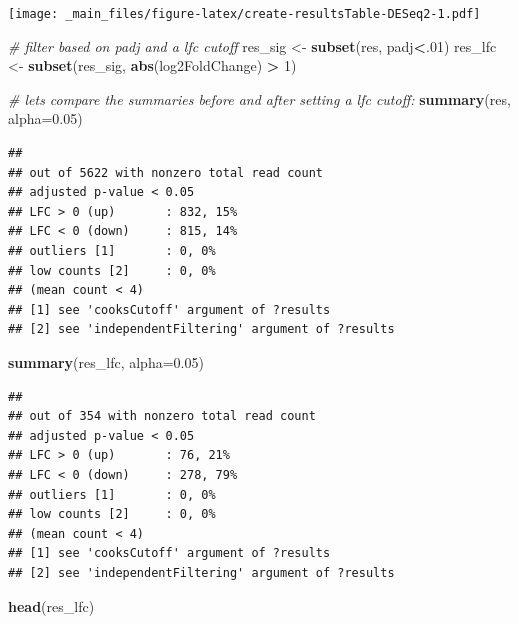 \documentclass[
]{book}
\newenvironment{Shaded}{\begin{snugshade}}{\end{snugshade}}
\newcommand{\AttributeTok}[1]{\textcolor[rgb]{0.13,0.29,0.53}{#1}}
\newcommand{\CommentTok}[1]{\textcolor[rgb]{0.56,0.35,0.01}{\textit{#1}}}
\newcommand{\DecValTok}[1]{\textcolor[rgb]{0.00,0.00,0.81}{#1}}
\newcommand{\FloatTok}[1]{\textcolor[rgb]{0.00,0.00,0.81}{#1}}
\newcommand{\FunctionTok}[1]{\textcolor[rgb]{0.13,0.29,0.53}{\textbf{#1}}}
\newcommand{\NormalTok}[1]{#1}
\newcommand{\OtherTok}[1]{\textcolor[rgb]{0.56,0.35,0.01}{#1}}
\newcommand{\SpecialCharTok}[1]{\textcolor[rgb]{0.81,0.36,0.00}{\textbf{#1}}}
\begin{document}
\texttt{[image: \_main\_files/figure-latex/create-resultsTable-DESeq2-1.pdf]}

\begin{Shaded}
\begin{Highlighting}[]
\CommentTok{\# filter based on padj and a lfc cutoff}
\NormalTok{res\_sig }\OtherTok{\textless{}{-}} \FunctionTok{subset}\NormalTok{(res, padj}\SpecialCharTok{\textless{}}\NormalTok{.}\DecValTok{01}\NormalTok{)}
\NormalTok{res\_lfc }\OtherTok{\textless{}{-}} \FunctionTok{subset}\NormalTok{(res\_sig, }\FunctionTok{abs}\NormalTok{(log2FoldChange) }\SpecialCharTok{\textgreater{}} \DecValTok{1}\NormalTok{)}
\end{Highlighting}
\end{Shaded}

\begin{Shaded}
\begin{Highlighting}[]
\CommentTok{\# let\textquotesingle{}s compare the summaries before and after setting a lfc cutoff:}
\FunctionTok{summary}\NormalTok{(res, }\AttributeTok{alpha=}\FloatTok{0.05}\NormalTok{)}
\end{Highlighting}
\end{Shaded}

\begin{verbatim}
## 
## out of 5622 with nonzero total read count
## adjusted p-value < 0.05
## LFC > 0 (up)       : 832, 15%
## LFC < 0 (down)     : 815, 14%
## outliers [1]       : 0, 0%
## low counts [2]     : 0, 0%
## (mean count < 4)
## [1] see 'cooksCutoff' argument of ?results
## [2] see 'independentFiltering' argument of ?results
\end{verbatim}

\begin{Shaded}
\begin{Highlighting}[]
\FunctionTok{summary}\NormalTok{(res\_lfc, }\AttributeTok{alpha=}\FloatTok{0.05}\NormalTok{)}
\end{Highlighting}
\end{Shaded}

\begin{verbatim}
## 
## out of 354 with nonzero total read count
## adjusted p-value < 0.05
## LFC > 0 (up)       : 76, 21%
## LFC < 0 (down)     : 278, 79%
## outliers [1]       : 0, 0%
## low counts [2]     : 0, 0%
## (mean count < 4)
## [1] see 'cooksCutoff' argument of ?results
## [2] see 'independentFiltering' argument of ?results
\end{verbatim}

\begin{Shaded}
\begin{Highlighting}[]
\FunctionTok{head}\NormalTok{(res\_lfc)}
\end{Highlighting}
\end{Shaded}
\end{document}
